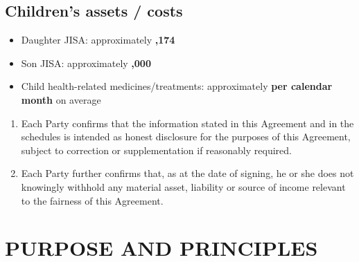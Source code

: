 \documentclass[10pt,a4paper]{article}
\begin{document}
\subsection*{Children's assets / costs}

\begin{itemize}[leftmargin=1.8em]
    \item Daughter JISA: approximately \textbf{,174}
    \item Son JISA: approximately \textbf{,000}
    \item Child health-related medicines/treatments: approximately \textbf{ per calendar month} on average
\end{itemize}

\begin{enumerate}[label=\arabic*., start=13, leftmargin=1.8em]
    \item Each Party confirms that the information stated in this Agreement and in the schedules is intended as honest disclosure for the purposes of this Agreement, subject to correction or supplementation if reasonably required.
    \item Each Party further confirms that, as at the date of signing, he or she does not knowingly withhold any material asset, liability or source of income relevant to the fairness of this Agreement.
\end{enumerate}

\section*{PURPOSE AND PRINCIPLES}
\end{document}
